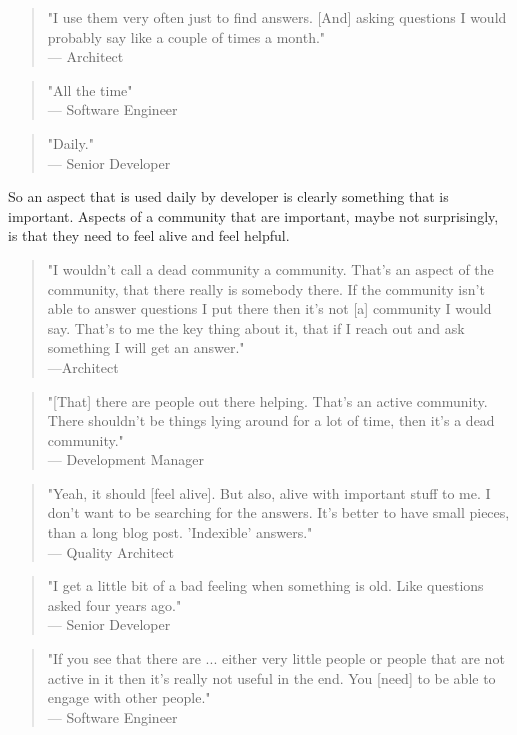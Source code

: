 \documentclass{article}
\begin{document}
\begin{quote}
"I use them very often just to find answers. [And] asking questions I would probably say like a couple of times a month."\\
--- Architect
\end{quote}
\begin{quote}
"All the time" \\
--- Software Engineer
\end{quote}
\begin{quote}
"Daily."\\
--- Senior Developer
\end{quote}
So an aspect that is used daily by developer is clearly something that is important. Aspects of a community that are important, maybe not surprisingly, is that they need to feel alive and feel helpful.
\begin{quote}
"I wouldn't call a dead community a community. That's an aspect of the community, that there really is somebody there. If the community isn't able to answer questions I put there then it's not [a] community I would say. That's to me the key thing about it, that if I reach out and ask something I will get an answer."\\---Architect
\end{quote}
\begin{quote}
"[That] there are people out there helping. That's an active community. There shouldn't be things lying around for a lot of time, then it's a dead community."\\--- Development Manager
\end{quote}
\begin{quote}
"Yeah, it should [feel alive]. But also, alive with important stuff to me. I don't want to be searching for the answers. It's better to have small pieces, than a long blog post. 'Indexible' answers."\\--- Quality Architect
\end{quote}
\begin{quote}
"I get a little bit of a bad feeling when something is old. Like questions asked four years ago." \\--- Senior Developer
\end{quote}
\begin{quote}
"If you see that there are ... either very little people or people that are not active in it then it's really not useful in the end. You [need] to be able to engage with other people."\\--- Software Engineer
\end{quote}
\end{document}
